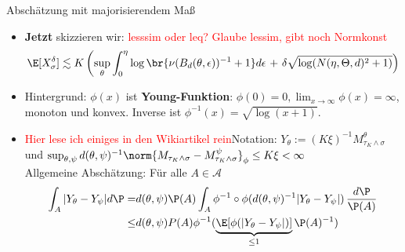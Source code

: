 \begin{frame}{Abschätzung mit majorisierendem Maß}
\begin{proofs}
    \begin{itemize}
        \item \textbf{Jetzt} skizzieren wir: \textcolor{red}{lesssim oder leq? Glaube lessim, gibt noch Normkonst} \small \[
    \E[X_\sigma^\delta] \lesssim  K\left(\sup_{\theta} \int_0^\eta \log\br{\nu(B_d(\theta, \epsilon))^{-1} + 1} d\epsilon\right. + \left. \delta \sqrt{\log(N(\eta, \Theta, d)^2 + 1)}\right)
        \]
        \normalsize
        \item Hintergrund: $\phi(x)$ ist \textbf{Young-Funktion}: $\phi(0)=0, \lim_{x \to \infty}\phi(x) = \infty$, monoton und konvex. Inverse ist $\phi^{-1}(x) = \sqrt{\log(x+1)}$. 
         \item \textcolor{red}{Hier lese ich einiges in den Wikiartikel rein}Notation: $Y_\theta := (K\xi)^{-1}M_{\tau_K \wedge \sigma}^\theta$ und \textcolor{red}{$ \sup_{\theta, \psi}d(\theta, \psi)^{-1}\norm{M_{\tau_K \wedge \sigma} - M_{\tau_K \wedge \sigma}^\psi}_\phi \leq K\xi <\infty$}\\ Allgemeine Abschätzung: Für alle $A \in \mathcal{A}$  
        \small
        \begin{align*}
            \int_A |Y_\theta-Y_\psi| d\P =& d(\theta, \psi) \P(A)\int_A \phi^{-1}\circ\phi(d(\theta, \psi)^{-1}|Y_\theta-Y_\psi|) \,\frac{d\P}{\P(A)} \\
            \leq& d(\theta, \psi) P(A)\phi^{-1}(\underbrace{\E[\phi(|Y_\theta-Y_\psi|) ]}_{\leq 1} \P(A)^{-1})
        \end{align*}
        \normalsize
    \end{itemize}
\end{proofs}
\end{frame}
